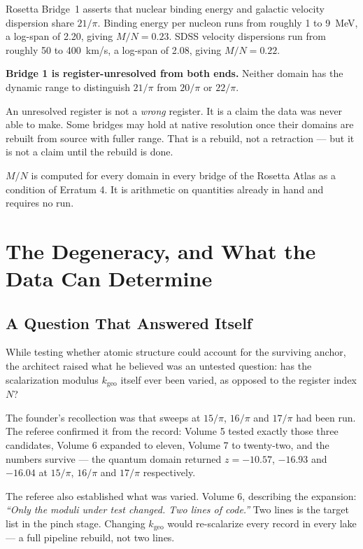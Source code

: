 \documentclass[11pt, letterpaper, openany]{book}
\newcommand{\kgeo}{k_{\mathrm{geo}}}
\begin{document}
Rosetta Bridge~1 asserts that nuclear binding energy and galactic velocity dispersion share
$21/\pi$. Binding energy per nucleon runs from roughly 1 to 9~MeV, a log-span of 2.20, giving
$M/N = 0.23$. SDSS velocity dispersions run from roughly 50 to 400~km/s, a log-span of 2.08,
giving $M/N = 0.22$.

\begin{erratumbox}
\textbf{Bridge 1 is register-unresolved from both ends.} Neither domain has the dynamic range to
distinguish $21/\pi$ from $20/\pi$ or $22/\pi$.

\medskip
\noindent An unresolved register is not a \emph{wrong} register. It is a claim the data was
never able to make. Some bridges may hold at native resolution once their domains are rebuilt
from source with fuller range. That is a rebuild, not a retraction --- but it is not a claim
until the rebuild is done.
\end{erratumbox}

$M/N$ is computed for every domain in every bridge of the Rosetta Atlas as a condition of
Erratum 4. It is arithmetic on quantities already in hand and requires no run.

\chapter{The Degeneracy, and What the Data Can Determine}

\section{A Question That Answered Itself}

While testing whether atomic structure could account for the surviving anchor, the architect
raised what he believed was an untested question: has the scalarization modulus $\kgeo$ itself
ever been varied, as opposed to the register index $N$?

The founder's recollection was that sweeps at $15/\pi$, $16/\pi$ and $17/\pi$ had been run. The
referee confirmed it from the record: Volume 5 tested exactly those three candidates, Volume 6
expanded to eleven, Volume 7 to twenty-two, and the numbers survive --- the quantum domain
returned $z = -10.57$, $-16.93$ and $-16.04$ at $15/\pi$, $16/\pi$ and $17/\pi$ respectively.

The referee also established what was varied. Volume 6, describing the expansion: \emph{``Only
the moduli under test changed. Two lines of code.''} Two lines is the target list in the pinch
stage. Changing $\kgeo$ would re-scalarize every record in every lake --- a full pipeline
rebuild, not two lines.
\end{document}
